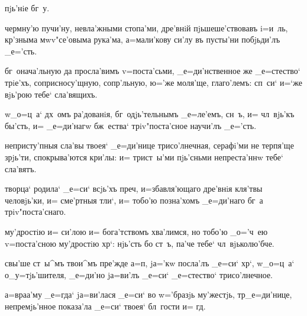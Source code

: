 
\kinovarsimple{канw'нъ тр\оченъ, [_е=гw'же краестро'чiе:} 
 пjь'нiе бг~у. 


  чермну'ю пучи'ну, невла'жными 
стопа'ми, дре'внiй пjьшеше'ствовавъ i=и~ль, 
кр'зныма мwv"се'овыма рука'ма, а=мали'кову си'лу 
въ пусты'ни побjьди'лъ _е='сть.

 бг~онача'льную да просла'вимъ v=поста'сьми, 
_е=ди'нственное же _е=стество` трiе'хъ, соприсносу'щную, 
сопр'льную, ю='же моля'ще, глаго'лемъ: сп~си` и=`же 
вjь'рою тебе` сла'вящихъ.

 w\т _о=ц~а` дх~омъ ра'дованiя, 
бг~одjь'тельнымъ _е=ле'емъ, сн~ъ, и= чл~вjь'къ бы'сть, и= 
_е=ди'нагw бж~ества` трiv"поста'сное научи'лъ _е='сть.

  непристу'пныя сла'вы твоея` 
_е=ди'нице трисо'лнечная, серафi'ми не терпя'ще зрjь'ти, 
спокрыва'ются кри'лы: и= трист~ы'ми пjь'сньми 
непреста'ннw тебе` сла'вятъ.

  творца` родила` _е=си` 
всjь'хъ преч, и=збавля'ющаго дре'внiя кля'твы 
человjь'ки, и= сме'ртныя тли`, и= тобо'ю позна'хомъ 
_е=ди'наго бг~а трiv"поста'снаго.


  му'дростiю и= си'лою и= бога'тствомъ 
хва'лимся, но тобо'ю _о='ч~ею v=поста'сною му'дростiю 
хр`: нjь'сть бо ст~ъ, па'че тебе` чл~вjьколю'бче.

 свы'ше ст~ы^мъ твои^мъ пре'жде а=п, 
jа='кw посла'лъ _е=си` хр`, w\т _о=ц~а` 
о_у=тjь'шителя, _е=ди'но jа=ви'лъ _е=си` _е=стество` 
трисо'лнечное.

 а=враа'му _е=гда` jа=ви'лася _е=си` во 
w='бразjь му'жестjь, тр _е=ди'нице, непремjь'нное 
показа'ла _е=си` твоея` бл~гости и= гд.

